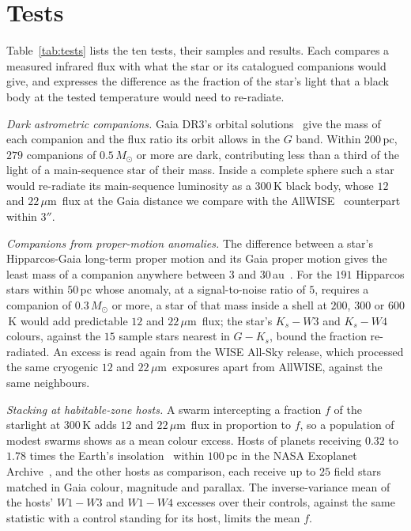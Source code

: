 \documentclass[3p,11pt]{elsarticle}
\newcommand{\um}{\,$\mu$m}
\begin{document}
\section{Tests}\label{sec:tests}

Table~\ref{tab:tests} lists the ten tests, their samples and results. Each compares a
measured infrared flux with what the star or its catalogued companions would give, and
expresses the difference as the fraction of the star's light that a black body at the
tested temperature would need to re-radiate.

\emph{Dark astrometric companions.} Gaia DR3's orbital solutions~\cite{Arenou2023} give
the mass of each companion and the flux ratio its orbit allows in the $G$ band. Within
$200$\,pc, $279$ companions of $0.5\,M_\odot$ or more are dark, contributing less than a
third of the light of a main-sequence star of their mass. Inside a complete sphere such
a star would re-radiate its main-sequence luminosity as a $300$\,K black body, whose
$12$ and $22$\um\ flux at the Gaia distance we compare with the AllWISE~\cite{Wright2010}
counterpart within $3''$.

\emph{Companions from proper-motion anomalies.} The difference between a star's
Hipparcos-Gaia long-term proper motion and its Gaia proper motion gives the least mass
of a companion anywhere between $3$ and $30$\,au~\cite{Kervella2022}. For the $191$
Hipparcos stars within $50$\,pc whose anomaly, at a signal-to-noise ratio of $5$,
requires a companion of $0.3\,M_\odot$ or more, a star of that mass inside a shell at
$200$, $300$ or $600$\,K would add predictable $12$ and $22$\um\ flux; the star's
$K_s-W3$ and $K_s-W4$ colours, against the $15$ sample stars nearest in $G-K_s$, bound
the fraction re-radiated. An excess is read again from the WISE All-Sky release, which
processed the same cryogenic $12$ and $22$\um\ exposures apart from AllWISE, against the
same neighbours.

\emph{Stacking at habitable-zone hosts.} A swarm intercepting a fraction $f$ of the
starlight at $300$\,K adds $12$ and $22$\um\ flux in proportion to $f$, so a population
of modest swarms shows as a mean colour excess. Hosts of planets receiving $0.32$ to
$1.78$ times the Earth's insolation~\cite{Kopparapu2013} within $100$\,pc in the NASA
Exoplanet Archive~\cite{Akeson2013}, and the other hosts as comparison, each receive up
to $25$ field stars matched in Gaia colour, magnitude and parallax. The inverse-variance
mean of the hosts' $W1-W3$ and $W1-W4$ excesses over their controls, against the same
statistic with a control standing for its host, limits the mean $f$.
\end{document}
